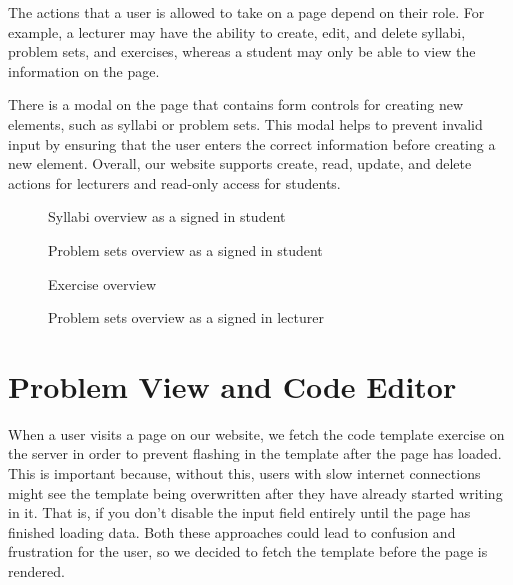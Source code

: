 The actions that a user is allowed to take on a page depend on their role. For example, a lecturer may have the ability to create, edit, and delete syllabi, problem sets, and exercises, whereas a student may only be able to view the information on the page.

There is a modal on the page that contains form controls for creating new elements, such as syllabi or problem sets.
This modal helps to prevent invalid input by ensuring that the user enters the correct information before creating a new element.
Overall, our website supports create, read, update, and delete actions for lecturers and read-only access for students.

\begin{figure}[H]
    \centering
    \caption{Syllabi overview as a signed in student}
    \label{fig:syllabi}
\end{figure}

\begin{figure}[H]
    \centering
    \caption{Problem sets overview as a signed in student}
    \label{fig:problemsets}
\end{figure}

\begin{figure}[H]
    \centering
    \caption{Exercise overview}
    \label{fig:exercise_overview}
\end{figure}

\begin{figure}[H]
    \centering
    \caption{Problem sets overview as a signed in lecturer}
    \label{fig:problemsets_teacher_view}
\end{figure}

\section{Problem View and Code Editor}
When a user visits a page on our website, we fetch the code template exercise on the server in order to prevent flashing in the template after the page has loaded.
This is important because, without this, users with slow internet connections might see the template being overwritten after they have already started writing in it. That is, if you don't disable the input field entirely until the page has finished loading data. Both these approaches could lead to confusion and frustration for the user, so we decided to fetch the template before the page is rendered.

